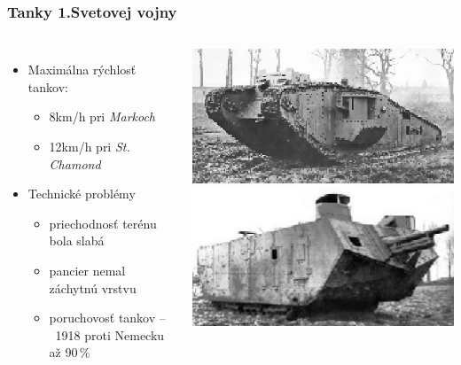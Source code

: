 \documentclass{beamer}
\begin{document}
	\begin{frame}
		\frametitle{Tanky 1.Svetovej vojny}
		\begin{columns}
				\begin{itemize}
					\item Maximálna rýchlosť tankov:
					\begin{itemize}
						\item 8km/h pri \textit{Markoch}
						\item 12km/h pri \textit{St. Chamond}
					\end{itemize}
					\smallskip
					\item Technické problémy
					\begin{itemize}
						\item priechodnosť terénu bola slabá
						\item pancier nemal záchytnú vrstvu
						\item poruchovosť tankov --\ 1918 proti Nemecku až 90\,\%
					\end{itemize}
				\end{itemize}
				
				\includegraphics[scale=0.8]{mark} \\
				\includegraphics[scale=0.512]{stchamond}
		\end{columns}
	\end{frame}
	
\end{document}
